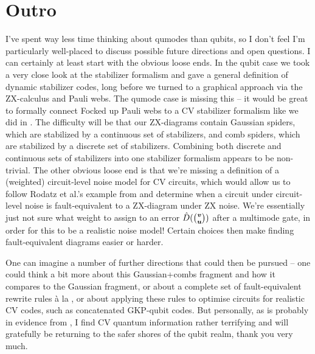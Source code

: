 \section{Outro}

I've spent way less time thinking about qumodes than qubits, so I don't feel I'm particularly well-placed to discuss possible future directions and open questions.
I can certainly at least start with the obvious loose ends.
In the qubit case we took a very close look at the stabilizer formalism and gave a general definition of dynamic stabilizer codes, long before we turned to a graphical approach via the ZX-calculus and Pauli webs.
The qumode case is missing this -- it would be great to formally connect Focked up Pauli webs to a CV stabilizer formalism like we did in .
The difficulty will be that our ZX-diagrams contain Gaussian spiders, which are stabilized by a continuous set of stabilizers, and comb spiders, which are stabilized by a discrete set of stabilizers.
Combining both discrete and continuous sets of stabilizers into one stabilizer formalism appears to be non-trivial.
The other obvious loose end is that we're missing a definition of a (weighted) circuit-level noise model for CV circuits, which would allow us to follow Rodatz et al.'s example from  and determine when a circuit under circuit-level noise is fault-equivalent to a ZX-diagram under ZX noise.
We're essentially just not sure what weight to assign to an error $\hat{D}(\tbinom{\boldsymbol{v}}{\boldsymbol{u}})$ after a multimode gate, in order for this to be a realistic noise model!
Certain choices then make finding fault-equivalent diagrams easier or harder.

One can imagine a number of further directions that could then be pursued -- one could think a bit more about this Gaussian+combs fragment and how it compares to the Gaussian fragment, or about a complete set of fault-equivalent rewrite rules à la , or about applying these rules to optimise circuits for realistic CV codes, such as concatenated GKP-qubit codes.
But personally, as is probably in evidence from , I find CV quantum information rather terrifying and will gratefully be returning to the safer shores of the qubit realm, thank you very much.
